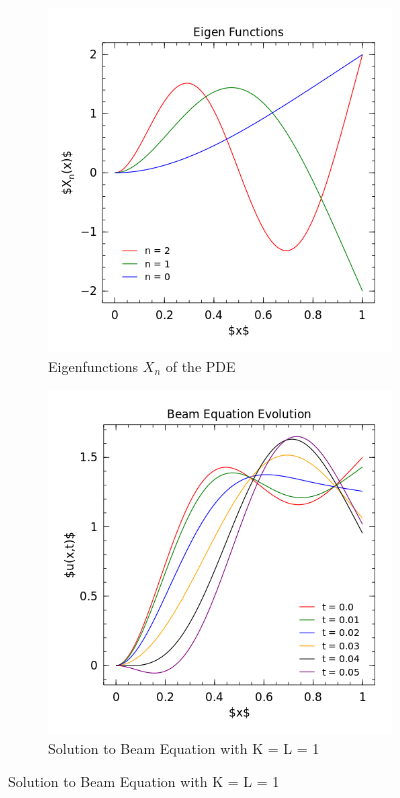 \documentclass[12pt]{article}
\theoremstyle{remark}
\begin{document}
\begin{figure}[H]
	\centering
	\begin{subfigure}{.5\textwidth}
		\centering
		\includegraphics[width=1.025\linewidth]{Q1_EigenFunctions.png}
		\caption{Eigenfunctions $X_n$ of the PDE}
		\label{fig:sub1}
	\end{subfigure}%
	\begin{subfigure}{.5\textwidth}
		\centering
		\includegraphics[width=1.025\linewidth]{Q1_BeamEq.png}
		\caption{Solution to Beam Equation with K = L = 1}
		\label{fig:sub2}
	\end{subfigure}
	\label{fig:test}
\end{figure}
\end{document}
